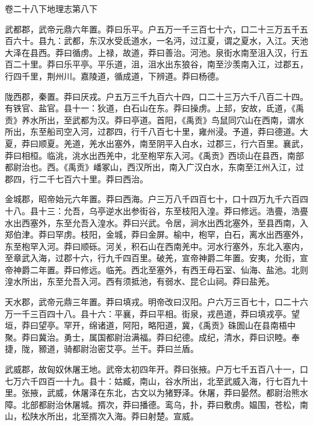 \documentclass[12pt,UTF8]{ctexbook}
\begin{document}
卷二十八下地理志第八下



武都郡，武帝元鼎六年置。莽曰乐平。户五万一千三百七十六，口二十三万五千五百六十。县九：武都，东汉水受氐道水，一名沔，过江夏，谓之夏水，入江。天池大泽在县西。莽曰循虏。上禄，故道，莽曰善治。河池。泉街水南至沮入汉，行五百二十里。莽曰乐平亭。平乐道，沮，沮水出东狼谷，南至沙羡南入江，过郡五，行四千里，荆州川。嘉陵道，循成道，下辨道。莽曰杨德。



陇西郡，秦置。莽曰厌戎。户五万三千九百六十四，口二十三万六千八百二十四。有铁官、盐官。县十一：狄道，白石山在东。莽曰操虏。上邽，安故，氐道，《禹贡》养水所出，至武都为汉。莽曰亭道。首阳，《禹贡》鸟鼠同穴山在西南，谓水所出，东至船司空入河，过郡四，行千八百七十里，雍州浸。予道，莽曰德道。大夏，莽曰顺夏。羌道，羌水出塞外，南至阴平入白水，过郡三，行六百里。襄武，莽曰相桓。临洮，洮水出西羌中，北至枹罕东入河。《禹贡》西顷山在县西，南部都尉治也。西。《禹贡》嶓冢山，西汉所出，南入广汉白水，东南至江州入江，过郡四，行二千七百六十里。莽曰西治。



金城郡，昭帝始元六年置。莽曰西海。户三万八千四百七十，口十四万九千六百四十八。县十三：允吾，乌亭逆水出参街谷，东至枝阳入湟。莽曰修远。浩亹，浩亹水出西塞外，东至允吾入湟水。莽曰兴武。令居，涧水出西北塞外，至县西南，入郑伯津。莽曰罕虏。枝阳，金城，莽曰金屏。榆中，枹罕，白石，离水出西塞外，东至枹罕入河。莽曰顺砾。河关，积石山在西南羌中。河水行塞外，东北入塞内，至章武入海，过郡十六，行九千四百里。破羌，宣帝神爵二年置。安夷，允街，宣帝神爵二年置。莽曰修远。临羌。西北至塞外，有西王母石室、仙海、盐池。北则湟水所出，东至允吾入河。西有须抵池，有弱水、昆仑山祠。莽曰盐羌。



天水郡，武帝元鼎三年置。莽曰填戎。明帝改曰汉阳。户六万三百七十，口二十六万一千三百四十八。县十六：平襄，莽曰平相。街泉，戎邑道，莽曰填戎亭。望垣，莽曰望亭。罕开，绵诸道，阿阳，略阳道，冀，《禹贡》硃圄山在县南梧中聚。莽曰冀治。勇士，属国都尉治满福。莽曰纪德。成纪，清水，莽曰识睦。奉捷，陇，豲道，骑都尉治密艾亭。兰干。莽曰兰盾。



武威郡，故匈奴休屠王地。武帝太初四年开。莽曰张掖。户万七千五百八十一，口七万六千四百一十九。县十：姑臧，南山，谷水所出，北至武威入海，行七百九十里。张掖，武威，休屠泽在东北，古文以为猪野泽。休屠，莽曰晏然。都尉治熊水障。北部都尉治休屠城。揟次，莽曰播德。鸾乌，扑，莽曰敷虏。媪围，苍松，南山，松陕水所出，北至揟次入海。莽曰射楚。宣威。
\end{document}
